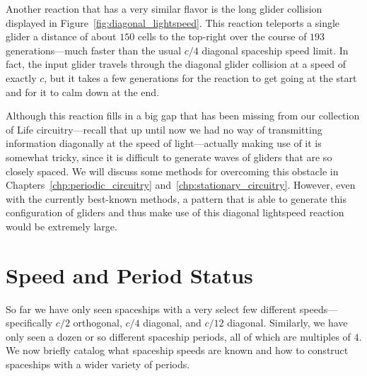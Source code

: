 Another reaction that has a very similar flavor is the long glider collision displayed in Figure~\ref{fig:diagonal_lightspeed}. This reaction teleports a single glider a distance of about $150$ cells to the top-right over the course of $193$ generations---much faster than the usual $c/4$ diagonal spaceship speed limit. In fact, the input glider travels through the diagonal glider collision at a speed of exactly $c$, but it takes a few generations for the reaction to get going at the start and for it to calm down at the end.

Although this reaction fills in a big gap that has been missing from our collection of Life circuitry---recall that up until now we had no way of transmitting information diagonally at the speed of light---actually making use of it is somewhat tricky, since it is difficult to generate waves of gliders that are so closely spaced. We will discuss some methods for overcoming this obstacle in Chapters~\ref{chp:periodic_circuitry} and~\ref{chp:stationary_circuitry}. However, even with the currently best-known methods, a pattern that is able to generate this configuration of gliders and thus make use of this diagonal lightspeed reaction would be extremely large.



\clearpage%

\section{Speed and Period Status}\label{sec:speed_period_status}

So far we have only seen spaceships with a very select few different speeds---specifically $c/2$ orthogonal, $c/4$ diagonal, and $c/12$ diagonal. Similarly, we have only seen a dozen or so different spaceship periods, all of which are multiples of $4$. We now briefly catalog what spaceship speeds are known and how to construct spaceships with a wider variety of periods.

